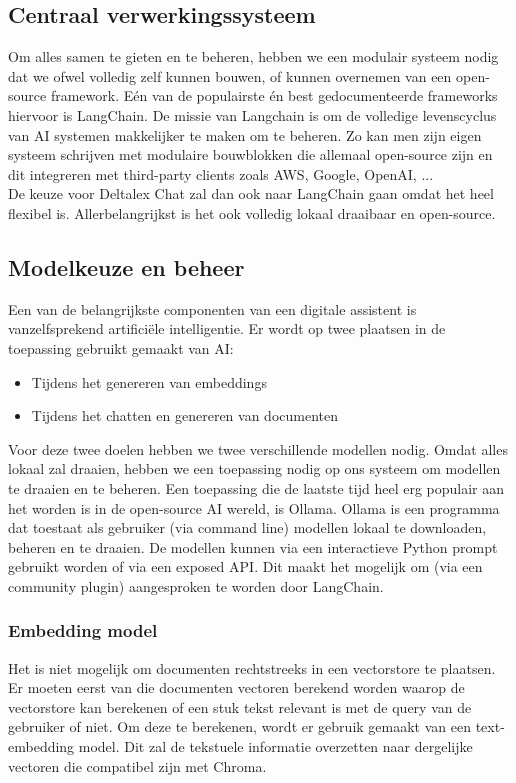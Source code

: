 \subsection{Centraal verwerkingssysteem}
Om alles samen te gieten en te beheren, hebben we een modulair systeem nodig dat we ofwel volledig zelf kunnen bouwen, of kunnen overnemen van een open-source framework. 
Eén van de populairste én best gedocumenteerde frameworks hiervoor is LangChain. 
De missie van Langchain is om de volledige levenscyclus van AI systemen makkelijker te maken om te beheren. 
Zo kan men zijn eigen systeem schrijven met modulaire bouwblokken die allemaal open-source zijn en dit integreren met third-party clients zoals AWS, Google, OpenAI, ... \\ 

De keuze voor Deltalex Chat zal dan ook naar LangChain gaan omdat het heel flexibel is. 
Allerbelangrijkst is het ook volledig lokaal draaibaar en open-source. 

\newpage
\subsection{Modelkeuze en beheer}
Een van de belangrijkste componenten van een digitale assistent is vanzelfsprekend artificiële intelligentie. 
Er wordt op twee plaatsen in de toepassing gebruikt gemaakt van AI: 

\begin{itemize}
	\item Tijdens het genereren van embeddings
	\item Tijdens het chatten en genereren van documenten
\end{itemize}

Voor deze twee doelen hebben we twee verschillende modellen nodig. 
Omdat alles lokaal zal draaien, hebben we een toepassing nodig op ons systeem om modellen te draaien en te beheren. 
Een toepassing die de laatste tijd heel erg populair aan het worden is in de open-source AI wereld, is Ollama. 
Ollama is een programma dat toestaat als gebruiker (via command line) modellen lokaal te downloaden, beheren en te draaien. 
De modellen kunnen via een interactieve Python prompt gebruikt worden of via een exposed API. 
Dit maakt het mogelijk om (via een community plugin) aangesproken te worden door LangChain. 

\subsubsection{Embedding model}
Het is niet mogelijk om documenten rechtstreeks in een vectorstore te plaatsen. 
Er moeten eerst van die documenten vectoren berekend worden waarop de vectorstore kan berekenen of een stuk tekst relevant is met de query van de gebruiker of niet. 
Om deze te berekenen, wordt er gebruik gemaakt van een text-embedding model. Dit zal de tekstuele informatie overzetten naar dergelijke vectoren die compatibel zijn met Chroma. 

